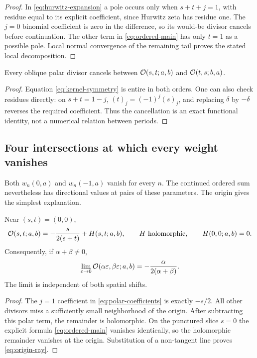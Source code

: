 \begin{proof}
In \eqref{eq:hurwitz-expansion} a pole occurs only when
$s+t+j=1$, with residue equal to its explicit coefficient, since
Hurwitz zeta has residue one. The $j=0$ binomial coefficient is zero
in the difference, so its would-be divisor cancels before
continuation. The other term in \eqref{eq:ordered-main} has only
$t=1$ as a possible pole. Local normal convergence of the remaining
tail proves the stated local decomposition.
\end{proof}

\begin{corollary}\label{cor:pole-cancellation}
Every oblique polar divisor cancels between $\mathcal O(s,t;a,b)$ and
$\mathcal O(t,s;b,a)$.
\end{corollary}
\begin{proof}
Equation \eqref{eq:kernel-symmetry} is entire in both orders. One
can also check residues directly: on $s+t=1-j$,
$(t)_j=(-1)^j(s)_j$, and replacing $\delta$ by $-\delta$
reverses the required coefficient. Thus the cancellation is an exact
functional identity, not a numerical relation between periods.
\end{proof}

\subsection{Four intersections at which every weight vanishes}

Both $w_n(0,a)$ and $w_n(-1,a)$ vanish for every $n$. The continued
ordered sum nevertheless has directional values at pairs of these
parameters. The origin gives the simplest explanation.

\begin{theorem}\label{thm:origin}
Near $(s,t)=(0,0)$,
\begin{equation}\label{eq:origin-germ}
 \mathcal O(s,t;a,b)=-\frac{s}{2(s+t)}+H(s,t;a,b),
 \qquad H\text{ holomorphic},\qquad H(0,0;a,b)=0.
\end{equation}
Consequently, if $\alpha+\beta\ne0$,
\begin{equation}\label{eq:origin-ray}
 \lim_{\varepsilon\to0}
 \mathcal O(\alpha\varepsilon,\beta\varepsilon;a,b)
        =-\frac{\alpha}{2(\alpha+\beta)}.
\end{equation}
The limit is independent of both spatial shifts.
\end{theorem}

\begin{proof}
The $j=1$ coefficient in \eqref{eq:polar-coefficients} is exactly
$-s/2$. All other divisors miss a sufficiently small neighborhood
of the origin. After subtracting this polar term, the remainder
is holomorphic. On the punctured slice $s=0$ the explicit
formula \eqref{eq:ordered-main} vanishes identically, so the
holomorphic remainder vanishes at the origin. Substitution of a
non-tangent line proves \eqref{eq:origin-ray}.
\end{proof}

